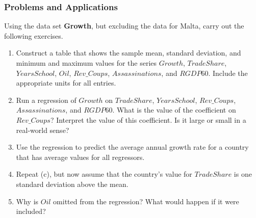 

\begin{frame}
\frametitle{Problems and Applications}
Using the data set \textbf{Growth}, but excluding the data for Malta, carry out the following exercises. 
\begin{enumerate}
\item Construct a table that shows the sample mean, standard deviation, and minimum and maximum values for the series $Growth$, $TradeShare$, $YearsSchool$, $Oil$, $Rev\_Coups$, $Assassinations$, and $RGDP60$. Include the appropriate units for all entries.
\item Run a regression of $Growth$ on $TradeShare$, $YearsSchool$, $Rev\_Coups$, $Assassinations$, and $RGDP60$. What is the value of the coefficient on $Rev\_Coups$? Interpret the value of this coefficient. Is it large or small in a real-world sense?
\item Use the regression to predict the average annual growth rate for a country that has average values for all regressors.
\item Repeat (c), but now assume that the country's value for $TradeShare$ is one standard deviation above the mean.
\item Why is $Oil$ omitted from the regression? What would happen if it were included?
\end{enumerate}
\end{frame}


